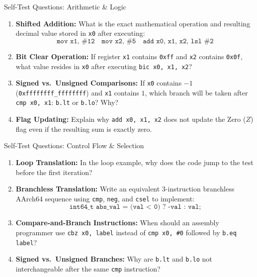 \documentclass[aspectratio=169,11pt,t]{beamer}
\newcommand{\key}[1]{\textbf{#1}}
\newcommand{\bits}[1]{\texttt{#1}}
\newcommand{\hex}[1]{\texttt{0x#1}}
\newcommand{\code}[1]{\texttt{#1}}
\begin{document}

\begin{frame}{Self-Test Questions: Arithmetic \& Logic}

\begin{enumerate}\setlength{\itemsep}{7pt}
  \item \key{Shifted Addition:} What is the exact mathematical operation and resulting decimal value stored in \bits{x0} after executing:
  $$\code{mov x1, \#12} \quad \code{mov x2, \#5} \quad \code{add x0, x1, x2, lsl \#2}$$

  \item \key{Bit Clear Operation:} If register \bits{x1} contains \hex{ff} and \bits{x2} contains \hex{0f}, what value resides in \bits{x0} after executing \code{bic x0, x1, x2}?

  \item \key{Signed vs.\ Unsigned Comparisons:} If \bits{x0} contains $-1$ (\hex{ffffffff\_ffffffff}) and \bits{x1} contains $1$, which branch will be taken after \code{cmp x0, x1}: \code{b.lt} or \code{b.lo}? Why?

  \item \key{Flag Updating:} Explain why \code{add x0, x1, x2} does not update the Zero ($Z$) flag even if the resulting sum is exactly zero.
\end{enumerate}

\end{frame}






\begin{frame}{Self-Test Questions: Control Flow \& Selection}

\begin{enumerate}\setlength{\itemsep}{7pt}
  \item \key{Loop Translation:} In the loop example, why does the code jump to the test before the first iteration?

  \item \key{Branchless Translation:} Write an equivalent 3-instruction branchless AArch64 sequence using \code{cmp}, \code{neg}, and \code{csel} to implement:
  $$\code{int64\_t abs\_val = (val < 0) ? -val : val;}$$

  \item \key{Compare-and-Branch Instructions:} When should an assembly programmer use \code{cbz x0, label} instead of \code{cmp x0, \#0} followed by \code{b.eq label}?

  \item \key{Signed vs.\ Unsigned Branches:} Why are \code{b.lt} and \code{b.lo} not interchangeable after the same \code{cmp} instruction?
\end{enumerate}

\end{frame}
\end{document}
